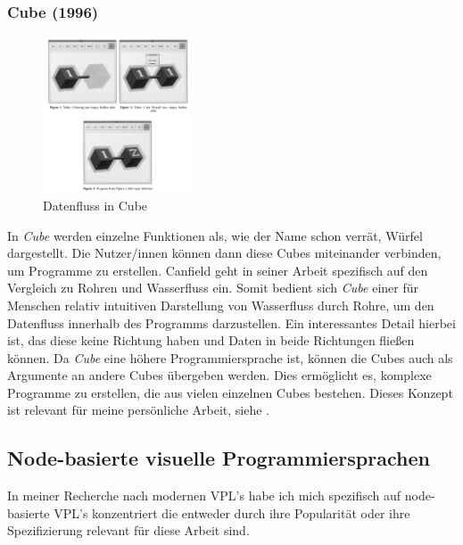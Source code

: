 \documentclass[ngerman]{article}
\begin{document}
\subsubsection{Cube (1996)}

\begingroup
\setlength\intextsep{2pt}

\begin{minipage}{\linewidth}
\begin{figure}
  \centering
  \includegraphics[width=0.4\textwidth]{./graphics/cube_vpl.png} %
  \caption{Datenfluss in Cube \cite{najork1996programming}}
  \label{fig:cube_demo}
\end{figure}
    \cite{najork1996programming}
In \textit{Cube} werden einzelne Funktionen als, wie der Name schon verrät, Würfel dargestellt. Die Nutzer/innen können dann diese Cubes miteinander verbinden, um Programme zu erstellen.
Canfield geht in seiner Arbeit spezifisch auf den Vergleich zu Rohren und Wasserfluss ein. Somit bedient sich \textit{Cube} einer für Menschen relativ intuitiven Darstellung von Wasserfluss durch Rohre, um den Datenfluss innerhalb des Programms darzustellen.
  Ein interessantes Detail hierbei ist, das diese  keine Richtung haben und Daten in beide Richtungen fließen können. 
Da \textit{Cube} eine höhere Programmiersprache ist, können die Cubes auch als Argumente an andere Cubes übergeben werden. Dies ermöglicht es, komplexe Programme zu erstellen, die aus vielen einzelnen Cubes bestehen. 
\br
Dieses Konzept ist relevant für meine persönliche Arbeit, siehe .

\end{minipage}
\endgroup
\pagebreak

\subsection{Node-basierte visuelle Programmiersprachen}
In meiner Recherche nach modernen VPL's habe ich mich spezifisch auf node-basierte VPL's konzentriert die entweder durch ihre Popularität oder ihre Spezifizierung relevant für diese Arbeit sind.
\end{document}
